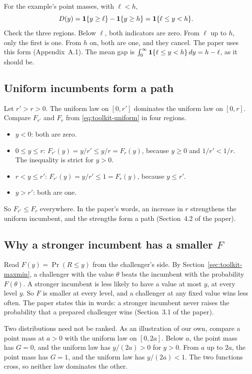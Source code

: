 For the example's point masses, with \(\ell<h\),
\[
D(y)=\mathbf{1}\{y\ge\ell\}-\mathbf{1}\{y\ge h\}=\mathbf{1}\{\ell\le y<h\}.
\]
Check the three regions. Below \(\ell\), both indicators are zero. From \(\ell\) up to \(h\), only the first is
one. From \(h\) on, both are one, and they cancel. The paper uses this form (Appendix~A.1). The mean gap is
\(\int_0^\infty\mathbf{1}\{\ell\le y<h\}\,dy=h-\ell\), as it should be.

\subsection{Uniform incumbents form a path}

Let \(r'>r>0\). The uniform law on \([0,r']\) dominates the uniform law on \([0,r]\). Compare
\(F_{r'}\) and \(F_r\) from \eqref{eq:toolkit-uniform} in four regions.
\begin{itemize}
\item \(y<0\): both are zero.
\item \(0\le y\le r\): \(F_{r'}(y)=y/r'\le y/r=F_r(y)\), because \(y\ge0\) and \(1/r'<1/r\). The inequality is
strict for \(y>0\).
\item \(r<y\le r'\): \(F_{r'}(y)=y/r'\le1=F_r(y)\), because \(y\le r'\).
\item \(y>r'\): both are one.
\end{itemize}
So \(F_{r'}\le F_r\) everywhere. In the paper's words, an increase in \(r\) strengthens the uniform incumbent, and
the strengths form a path (Section~4.2 of the paper).

\subsection{Why a stronger incumbent has a smaller \(F\)}

Read \(F(y)=\Pr(R\le y)\) from the challenger's side. By Section~\ref{sec:toolkit-maxmin}, a challenger with the
value \(\theta\) beats the incumbent with the probability \(F(\theta)\). A stronger incumbent is less likely to have
a value at most \(y\), at every level \(y\). So \(F\) is smaller at every level, and a challenger at any fixed value
wins less often. The paper states this in words: a stronger incumbent never raises the probability that a
prepared challenger wins (Section~3.1 of the paper).

Two distributions need not be ranked. As an illustration of our own, compare a point mass at \(a>0\) with the
uniform law on \([0,2a]\). Below
\(a\), the point mass has \(G=0\), and the uniform law has \(y/(2a)>0\) for \(y>0\). From \(a\) up to \(2a\), the
point mass has \(G=1\), and the uniform law has \(y/(2a)<1\). The two functions cross, so neither law dominates the
other.

